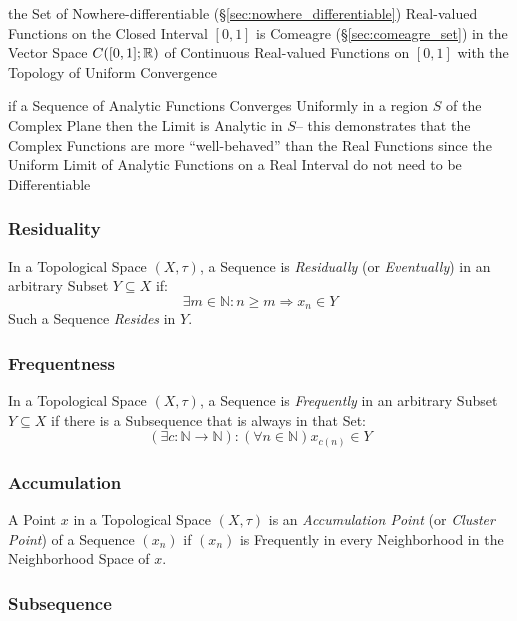the Set of Nowhere-differentiable (\S\ref{sec:nowhere_differentiable})
Real-valued Functions on the Closed Interval $[0,1]$ is Comeagre
(\S\ref{sec:comeagre_set}) in the Vector Space $C([0,1]; \mathbb{R})$ of Continuous
Real-valued Functions on $[0,1]$ with the Topology of Uniform Convergence

if a Sequence of Analytic Functions Converges Uniformly in a region $S$ of the
Complex Plane then the Limit is Analytic in $S$-- this demonstrates that the
Complex Functions are more ``well-behaved'' than the Real Functions since the
Uniform Limit of Analytic Functions on a Real Interval do not need to be
Differentiable



\subsubsection{Residuality}\label{sec:reside}

In a Topological Space $(X, \tau)$, a Sequence is \emph{Residually}
(or \emph{Eventually}) in an arbitrary Subset $Y \subseteq X$ if:
\[
  \exists m \in \mathbb{N} : n \geq m \Rightarrow x_n \in Y
\]
Such a Sequence \emph{Resides} in $Y$.



\subsubsection{Frequentness}\label{sec:frequent}

In a Topological Space $(X, \tau)$, a Sequence is \emph{Frequently}
in an arbitrary Subset $Y \subseteq X$ if there is a Subsequence that
is always in that Set:
\[
  (\exists c : \mathbb{N} \rightarrow \mathbb{N})
  : (\forall n \in \mathbb{N}) x_{c(n)} \in Y
\]



\subsubsection{Accumulation}\label{sec:accumulation}

A Point $x$ in a Topological Space $(X, \tau)$ is an
\emph{Accumulation Point} (or \emph{Cluster Point}) of a Sequence
$(x_n)$ if $(x_n)$ is Frequently in every Neighborhood in the
Neighborhood Space of $x$.



\subsubsection{Subsequence}\label{sec:subsequence_topology}

